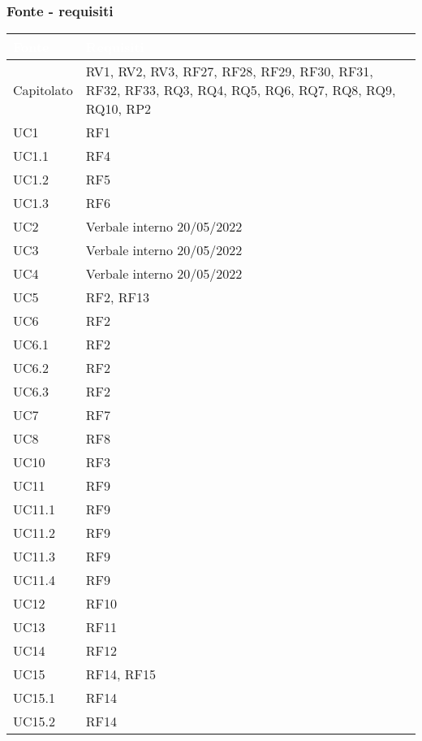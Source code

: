 \subsubsection{Fonte - requisiti}
{
      \setlength{\freewidth}{\dimexpr\textwidth-0\tabcolsep}
      \renewcommand{\arraystretch}{1.5}
      \centering
      \setlength{\aboverulesep}{0pt}
      \setlength{\belowrulesep}{0pt}
      \begin{longtable}{C{.47\freewidth} C{.47\freewidth}}
         \toprule
      \textcolor{white}{\textbf{Fonte}}&
      \textcolor{white}{\textbf{Requisiti}}\\
      \toprule
      \endhead
      
      Capitolato & RV1, RV2, RV3, RF27, RF28, RF29, RF30, RF31, RF32, RF33,
                   RQ3, RQ4, RQ5, RQ6, RQ7, RQ8, RQ9, RQ10,
                   RP2\\
      UC1 & RF1\\
      UC1.1 & RF4\\
      UC1.2 & RF5\\
      UC1.3 & RF6\\
      UC2 & Verbale interno 20/05/2022\\
      UC3 & Verbale interno 20/05/2022\\
      UC4 & Verbale interno 20/05/2022\\
      UC5 & RF2, RF13\\
      UC6 & RF2 \\
      UC6.1 & RF2\\
      UC6.2 & RF2\\
      UC6.3 & RF2\\
      UC7 & RF7 \\
      UC8 & RF8 \\
      UC10 & RF3 \\
      UC11 & RF9\\
      UC11.1 & RF9 \\
      UC11.2 & RF9 \\
      UC11.3 & RF9 \\
      UC11.4 & RF9 \\
      UC12 & RF10\\
      UC13 & RF11\\
      UC14 & RF12\\
      UC15 & RF14, RF15 \\
      UC15.1 & RF14 \\
      UC15.2 & RF14 \\

\end{longtable}}
